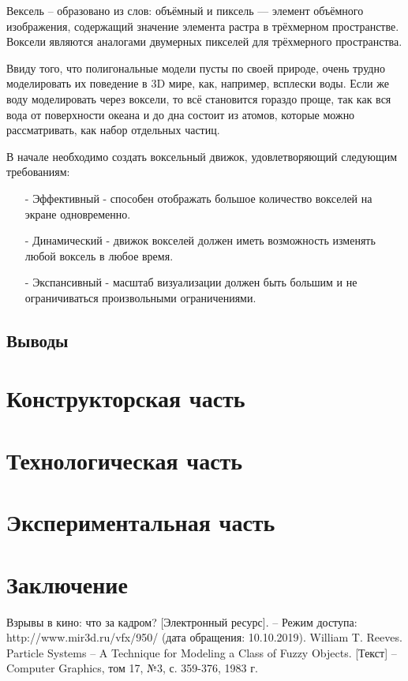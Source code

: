 \documentclass[a4paper,14pt]{article} %
\newcommand{\anonsection}[1]{\section*{#1}\addcontentsline{toc}{section}{#1}}
\begin{document}
	Вексель -- образовано из слов: объёмный и пиксель — элемент объёмного изображения, содержащий значение элемента растра в трёхмерном пространстве. Воксели являются аналогами двумерных пикселей для трёхмерного пространства. 

	Ввиду того, что полигональные модели пусты по своей природе, очень трудно моделировать их поведение в 3D мире, как, например, всплески воды. Если же воду моделировать через воксели, то всё становится гораздо проще, так как вся вода от поверхности океана и до дна состоит из атомов, которые можно рассматривать, как набор отдельных частиц.
	
	В начале необходимо создать воксельный движок, удовлетворяющий следующим требованиям:
	\begin{enumerate}
	\item[-] Эффективный - способен отображать большое количество вокселей на экране одновременно.

	\item[-] Динамический - движок вокселей должен иметь возможность изменять любой воксель в любое время.

	\item[-] Экспансивный - масштаб визуализации должен быть большим и не ограничиваться произвольными ограничениями.
	\end{enumerate}

	\subsection{Выводы}
	\hfill
        
        
	\newpage

	\section{Конструкторская часть}
	
	\hfill
	
	
	
	\newpage
	\section{Технологическая часть}
	\hfill
	\newpage
        
	\section{Экспериментальная часть}
	\hfill
	\newpage

	\anonsection{Заключение}
	\hfill
 	\newpage

	\begin{thebibliography}{}
        		\bibitem{} Взрывы в кино: что за кадром? [Электронный ресурс]. -- Режим доступа: http://www.mir3d.ru/vfx/950/ (дата обращения: 10.10.2019).
		\bibitem{} William T. Reeves. Particle Systems – A Technique for Modeling a Class of Fuzzy Objects. [Текст]  – Computer Graphics, том 17, №3, с. 359-376, 1983 г.
	\end{thebibliography} 
\end{document}
